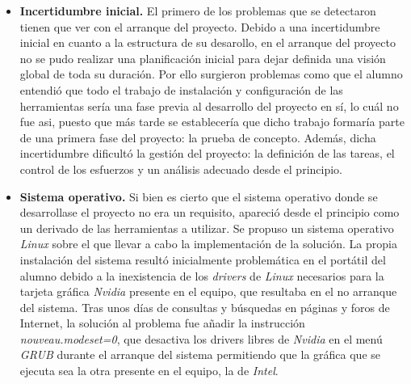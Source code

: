 \begin{itemize}
\item \textbf{Incertidumbre inicial.} El primero de los problemas que se detectaron tienen que ver con el arranque del proyecto. Debido a una incertidumbre inicial en cuanto a la estructura de su desarollo, en el arranque del proyecto no se pudo realizar una planificación inicial para dejar definida una visión global de toda su duración. Por ello surgieron problemas como que el alumno entendió que todo el trabajo de instalación y configuración de las herramientas sería una fase previa al desarrollo del proyecto en sí, lo cuál no fue asi, puesto que más tarde se establecería que dicho trabajo formaría parte de una primera fase del proyecto: la prueba de concepto. Además, dicha incertidumbre dificultó la gestión del proyecto: la definición de las tareas, el control de los esfuerzos y un análisis adecuado desde el principio.

\item \textbf{Sistema operativo.} Si bien es cierto que el sistema operativo donde se desarrollase el proyecto no era un requisito, apareció desde el principio como un derivado de las herramientas a utilizar. Se propuso un sistema operativo \textit{Linux} \cite{wikilinux} sobre el que llevar a cabo la implementación de la solución. 
La propia instalación del sistema resultó inicialmente problemática en el portátil del alumno debido a la inexistencia de los \textit{drivers} de \textit{Linux} necesarios para la tarjeta gráfica \textit{Nvidia} \cite{wikinvidia} presente en el equipo, que resultaba en el no arranque del sistema. Tras unos días de consultas y búsquedas en páginas y foros de Internet, la solución al problema fue añadir la instrucción \textit{nouveau.modeset=0}, que desactiva los drivers libres de \textit{Nvidia} en el menú \textit{GRUB} \cite{grub} durante el arranque del sistema permitiendo que la gráfica que se ejecuta sea la otra presente en el equipo, la de \textit{Intel}.


\end{itemize}
